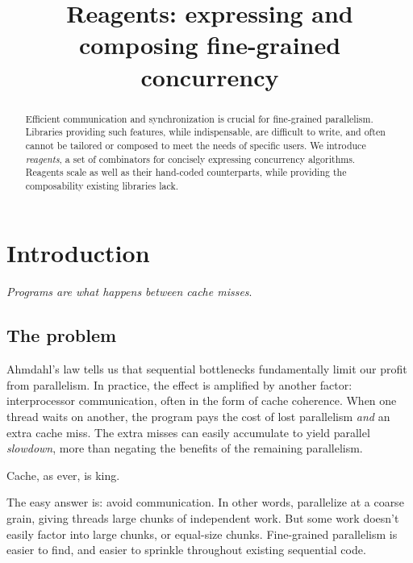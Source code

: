 \documentclass[preprint,nocopyrightspace]{sigplanconf}
\begin{document}

\title{Reagents: expressing and composing fine-grained concurrency\\
\vskip -6pt}
\maketitle

\begin{abstract}
Efficient communication and synchronization is crucial for fine-grained
parallelism.  Libraries providing such features, while indispensable, are
difficult to write, and often cannot be tailored or composed to meet the needs
of specific users.  We introduce \emph{reagents}, a set of combinators for
concisely expressing concurrency algorithms.  Reagents scale as well as their
hand-coded counterparts, while providing the composability existing libraries
lack.
\end{abstract}

\section{Introduction}

\emph{Programs are what happens between cache
  misses}. %

\subsection*{The problem}

Ahmdahl's law tells us that sequential bottlenecks fundamentally limit our
profit from parallelism.  In practice, the effect is amplified by
another factor: interprocessor communication, often in the form of cache
coherence.  When one thread waits on another, the program pays the cost of
lost parallelism \emph{and} an extra cache miss.  The extra misses can easily
accumulate to yield parallel \emph{slowdown}, more than negating the benefits
of the remaining parallelism.

Cache, as ever, is king.

The easy answer is: avoid communication.  In other words, parallelize at a
coarse grain, giving threads large chunks of independent work.  But some work
doesn't easily factor into large chunks, or equal-size chunks.  Fine-grained
parallelism is easier to find, and easier to sprinkle throughout existing
sequential code.
\end{document}
